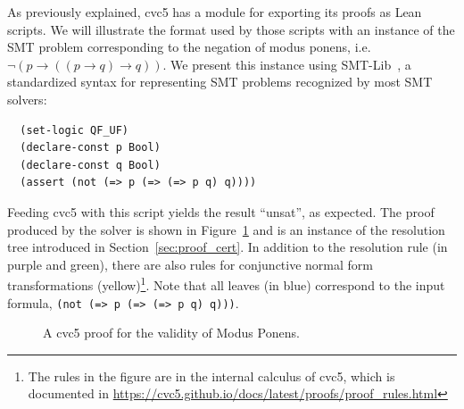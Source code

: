 As previously explained, cvc5 has a module for exporting its proofs as Lean scripts.
We will illustrate the format used by those scripts with an instance of the SMT problem corresponding
to the negation of modus ponens, i.e. $\neg (p \rightarrow ((p \rightarrow q) \rightarrow q))$.
We present this instance using SMT-Lib~\cite{smtlib}, a standardized syntax for
representing SMT problems recognized by most SMT solvers:

\begin{verbatim}
  (set-logic QF_UF)
  (declare-const p Bool)
  (declare-const q Bool)
  (assert (not (=> p (=> (=> p q) q))))
\end{verbatim}

Feeding cvc5 with this script yields the result ``unsat'', as expected. The proof produced by the solver is shown in Figure~\ref{fig:cvc5-proof} and is an instance of the resolution tree introduced in Section~\ref{sec:proof_cert}. In addition to the resolution rule (in purple and green), there are also rules for conjunctive normal form transformations (yellow)\footnote{The rules in the figure are in the internal calculus of cvc5, which is documented in \url{https://cvc5.github.io/docs/latest/proofs/proof_rules.html}}. Note that all leaves (in blue) correspond to the input formula, \texttt{(not (=> p (=> (=> p q) q)))}.

\makeatletter
\setlength{\@fptop}{0pt}
\makeatother

\begin{figure}[t!]
  \centering
  \caption{A cvc5 proof for the validity of Modus Ponens.}
  \label{fig:cvc5-proof}
\end{figure}

